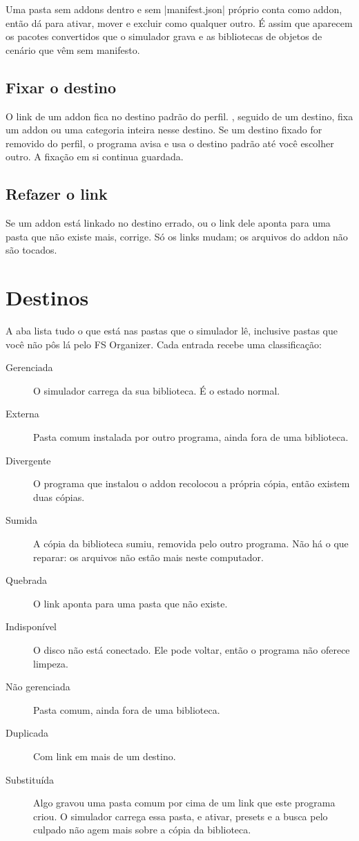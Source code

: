 \documentclass[11pt,a4paper]{article}
\begin{document}
Uma pasta sem addons dentro e sem \where|manifest.json| próprio conta como
addon, então dá para ativar, mover e excluir como qualquer outro. É assim que
aparecem os pacotes convertidos que o simulador grava e as bibliotecas de
objetos de cenário que vêm sem manifesto.

\subsection{Fixar o destino}

O link de um addon fica no destino padrão do perfil. , seguido
de um destino, fixa um addon ou uma categoria inteira nesse destino. Se um destino
fixado for removido do perfil, o programa avisa e usa o destino padrão até você
escolher outro. A fixação em si continua guardada.

\subsection{Refazer o link}

Se um addon está linkado no destino errado, ou o link dele aponta para uma pasta
que não existe mais,  corrige. Só os
links mudam; os arquivos do addon não são tocados.

\section{Destinos}

A aba  lista tudo o que está nas pastas que o simulador lê,
inclusive pastas que você não pôs lá pelo FS Organizer. Cada entrada recebe uma
classificação:


\begin{description}
  \item[Gerenciada] O simulador carrega da sua biblioteca. É o estado normal.
  \item[Externa] Pasta comum instalada por outro programa, ainda fora de uma
    biblioteca.
  \item[Divergente] O programa que instalou o addon recolocou a própria cópia,
    então existem duas cópias.
  \item[Sumida] A cópia da biblioteca sumiu, removida pelo outro programa. Não
    há o que reparar: os arquivos não estão mais neste computador.
  \item[Quebrada] O link aponta para uma pasta que não existe.
  \item[Indisponível] O disco não está conectado. Ele pode voltar, então o
    programa não oferece limpeza.
  \item[Não gerenciada] Pasta comum, ainda fora de uma biblioteca.
  \item[Duplicada] Com link em mais de um destino.
  \item[Substituída] Algo gravou uma pasta comum por cima de um link que este
    programa criou. O simulador carrega essa pasta, e ativar, presets e a busca
    pelo culpado não agem mais sobre a cópia da biblioteca.
\end{description}
\end{document}
